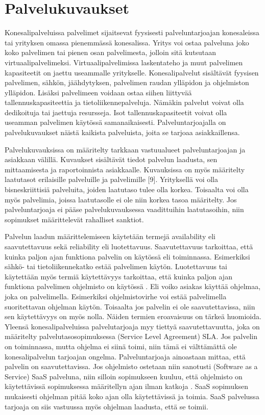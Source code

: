 \section{Palvelukuvaukset}
Konesalipalveluissa palvelimet sijaitsevat fyysisesti palveluntarjoajan konesaleissa tai yrityksen omassa pienemmässä konesalissa. Yritys voi ostaa palveluna joko koko palvelimen tai pienen osan palvelimesta, jolloin sitä kutsutaan virtuaalipalvelimeksi. Virtuaalipalvelimissa laskentateho ja muut palvelimen kapasiteetit on jaettu useammalle yritykselle. Konesalipalvelut sisältävät fyysisen palvelimen, sähkön, jäähdytyksen, palvelimen raudan ylläpidon ja ohjelmiston ylläpidon. Lisäksi palvelimeen voidaan ostaa siihen liittyvää tallennuskapasiteettia ja tietoliikennepalveluja. Nämäkin palvelut voivat olla dedikoituja tai jaettuja resursseja. Isot tallennuskapasiteetit voivat olla useamman palvelimen käytössä samanaikaisesti. Palveluntarjoajalla on palvelukuvaukset näistä kaikista palveluista, joita se tarjoaa asiakkaillensa. \citep{handbook}

Palvelukuvauksissa on määritelty tarkkaan vastuualueet palveluntarjoajan ja asiakkaan välillä. Kuvaukset sisältävät tiedot palvelun laadusta, sen mittaamisesta ja raportoinnista asiakkaalle. Kuvauksissa on myös määritelty laatutasot erilaisille palveluille ja palvelimille [9]. Yrityksellä voi olla bisneskriittisiä palveluita, joiden laatutaso tulee olla korkea. Toisaalta voi olla myös palvelimia, joissa laatutasolle ei ole niin korkea tasoa määritelty. Jos palveluntarjoaja ei pääse palvelukuvauksessa vaadittuihin laatutasoihin, niin sopimukset määrittelevät rahalliset sanktiot.

Palvelun laadun määrittelemiseen käytetään termejä availability eli saavutettavuus sekä reliability eli luotettavuus. Saavutettavuus tarkoittaa, että kuinka paljon ajan funktiona palvelin on käytössä eli toiminnassa. Esimerkiksi sähkö- tai tietoliikennekatko estää palvelimen käytön. Luotettavuus tai käytettään myös termiä käytettävyys tarkoittaa, että kuinka paljon ajan funktiona palvelimen ohjelmisto on käytössä \citep{service_availability} \citep{itil}. Eli voiko asiakas käyttää ohjelmaa, joka on palvelimella. Esimerkiksi ohjelmistovirhe voi estää palvelimella suoritettavan ohjelman käytön. Toisaalta jos palvelin ei ole saavutettavissa, niin sen käytettävyys on myös nolla. Näiden termien eroavaisuus on tärkeä huomioida. Yleensä konesalipalveluissa palvelutarjoaja myy tiettyä saavutettavuutta, joka on määritelty palvelutasosopimuksessa (Service Level Agreement) SLA. Jos palvelin on toiminnassa, mutta ohjelma ei siinä toimi, niin tämä ei välttämättä ole konesalipalvelun tarjoajan ongelma. Palveluntarjoaja ainoastaan mittaa, että palvelin on saavutettavissa. Jos ohjelmisto ostetaan niin sanotusti (Software as a Service) SaaS palveluna, niin silloin sopimukseen kuuluu, että ohjelmisto on käytettävissä sopimuksessa määritellyn ajan ilman katkoja \citep{software_service}. SaaS sopimuksen mukaisesti ohjelman pitää koko ajan olla käytettävissä ja toimia. SaaS palvelussa tarjoaja on siis vastuussa myös ohjelman laadusta, että se toimii.

